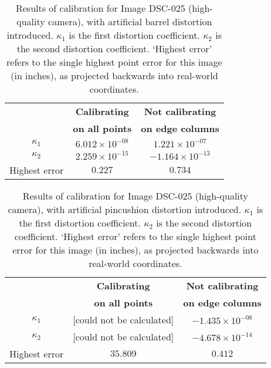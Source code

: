 \begin{table}[h!]
  \centering
  \begin{tabular}{c c c}
    \toprule
    \textbf{ } & \textbf{Calibrating} & \textbf{Not calibrating}\\
    \textbf{ } & \textbf{on all points} & \textbf{on edge columns}\\
    \midrule
    $\kappa_{1}$ & $6.012 \times 10^{-08}$ & $1.221 \times 10^{-07}$\\
    $\kappa_{2}$ & $2.259 \times 10^{-15}$ & $-1.164 \times 10^{-13}$\\
    Highest error & $0.227$ & $0.734$\\
    \bottomrule
  \end{tabular}
  \caption[Results of calibration for Image DSC-025 (high-quality camera) with barrel distortion]{Results of calibration for Image DSC-025 (high-quality camera), with artificial barrel distortion introduced. $\kappa_{1}$ is the first distortion coefficient. $\kappa_{2}$ is the second distortion coefficient. `Highest error' refers to the single highest point error for this image (in inches), as projected backwards into real-world coordinates.}
  \label{tbl:calibration-stats-dsc-2}
\end{table}

\begin{table}[h!]
  \centering
  \begin{tabular}{c c c}
    \toprule
    \textbf{ } & \textbf{Calibrating} & \textbf{Not calibrating}\\
    \textbf{ } & \textbf{on all points} & \textbf{on edge columns}\\
    \midrule
    $\kappa_{1}$ & [could not be calculated] & $-1.435 \times 10^{-08}$\\
    $\kappa_{2}$ & [could not be calculated] & $-4.678 \times 10^{-14}$\\
    Highest error & $35.809$ & $0.412$\\
    \bottomrule
  \end{tabular}
  \caption[Results of calibration for Image DSC-025 (high-quality camera) with pincushion distortion]{Results of calibration for Image DSC-025 (high-quality camera), with artificial pincushion distortion introduced. $\kappa_{1}$ is the first distortion coefficient. $\kappa_{2}$ is the second distortion coefficient. `Highest error' refers to the single highest point error for this image (in inches), as projected backwards into real-world coordinates.}
  \label{tbl:calibration-stats-dsc-3}
\end{table}


